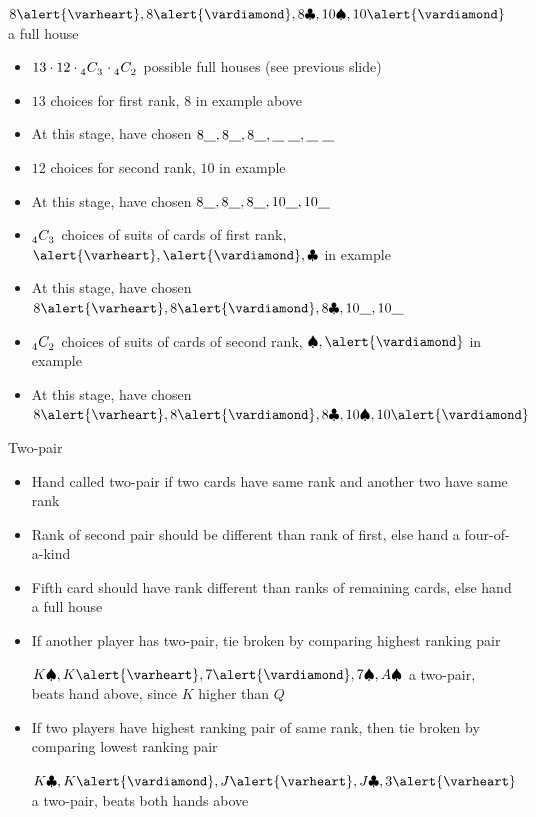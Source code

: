 \documentclass{beamer}
\theoremstyle{definition}
\newcommand\ncr[2]{\tensor[_{#1}]C{_{#2}}}
\newcommand{\hs}{\alert{\varheart}}
\newcommand{\ds}{\alert{\vardiamond}}
\newcommand{\s}{\spadesuit}
\newcommand{\cs}{\clubsuit}
\begin{document}
\begin{frame}
\newcommand{\bl}{\underline{\hspace{3mm}}}
\begin{example} $8\hs,8\ds,8\cs,10\s,10\ds$ a full house\end{example}
\begin{itemize}
\item $13\cdot 12\cdot\ncr{4}{3}\cdot\ncr{4}{2}$ possible full houses
(see previous slide)
\item $13$ choices for first rank, $8$ in example above
\item At this stage, have chosen
$8\bl,8\bl,8\bl,\bl\;\bl,\bl\;\bl$
\item $12$ choices for second rank, $10$ in example
\item At this stage, have chosen
$8\bl,8\bl,8\bl,10\bl,10\bl$
\item $\ncr{4}{3}$ choices of suits of cards of first
rank, $\hs,\ds,\cs$ in example
\item At this stage, have chosen
$8\hs,8\ds,8\cs,10\bl,10\bl$
\item $\ncr{4}{2}$ choices of suits of cards of second
rank, $\s,\ds$ in example
\item At this stage, have chosen
$8\hs,8\ds,8\cs,10\s,10\ds$
\end{itemize}
\end{frame}

\begin{frame}{Two-pair}
\begin{itemize}
\item Hand called \alert{two-pair} if two
cards have same rank and another two have same rank
\item Rank of second pair should be different than rank of first,
else hand a four-of-a-kind
\item Fifth card should have rank different than ranks
of remaining cards, else hand a full house
\end{itemize}
\end{frame}

\begin{frame}
\begin{itemize}
\begin{example} $2\hs,2\ds,Q\cs,Q\s,10\ds$ a two-pair\end{example}
\item If another player has two-pair, tie broken
by comparing highest ranking pair
\begin{example} $K\s,K\hs,7\ds,7\s,A\s$ a two-pair,
beats hand above, since $K$ higher than $Q$\end{example}
\item If two players have
highest ranking pair of same rank, then tie broken
by comparing lowest ranking pair
\begin{example} $K\cs,K\ds,J\hs,J\cs,3\hs$ a two-pair,
beats both hands above\end{example}
\end{itemize}
\end{frame}
\end{document}
